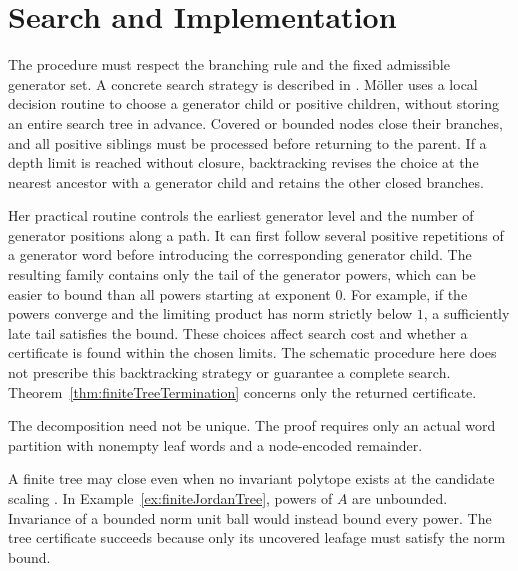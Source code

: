 \section{Search and Implementation}

\begin{remark}
    \label{rem:moller}
    The procedure  must respect the branching rule and the fixed admissible generator set.
    A concrete search strategy is described in \citet[Sections~4.1--4.2, Algorithms~4.3--4.4]{Moeller2015NewStrategyExactJSR}.
    M\"oller uses a local decision routine to choose a generator child or positive children, without storing an entire search tree in advance.
    Covered or bounded nodes close their branches, and all positive siblings must be processed before returning to the parent.
    If a depth limit is reached without closure, backtracking revises the choice at the nearest ancestor with a generator child and retains the other closed branches.

    Her practical routine controls the earliest generator level and the number of generator positions along a path.
    It can first follow several positive repetitions of a generator word before introducing the corresponding generator child.
    The resulting family contains only the tail of the generator powers, which can be easier to bound than all powers starting at exponent $0$.
    For example, if the powers converge and the limiting product has norm strictly below $1$, a sufficiently late tail satisfies the bound.
    These choices affect search cost and whether a certificate is found within the chosen limits.
    The schematic procedure here does not prescribe this backtracking strategy or guarantee a complete search.
    Theorem~\ref{thm:finiteTreeTermination} concerns only the returned certificate.
\end{remark}

\begin{remark}
    \label{rem:finiteTreeDecomposition}
    The decomposition need not be unique.
    The proof requires only an actual word partition with nonempty leaf words and a node-encoded remainder.
\end{remark}

\begin{remark}
    \label{rem:finiteGeneratorNecessity}
    A finite tree may close even when no invariant polytope exists at the candidate scaling \citep{MoellerReif2014TreeBasedJSR,MejstrikReif2025HybridApproachJSR}.
    In Example~\ref{ex:finiteJordanTree}, powers of $A$ are unbounded.
    Invariance of a bounded norm unit ball would instead bound every power.
    The tree certificate succeeds because only its uncovered leafage must satisfy the norm bound.
\end{remark}
